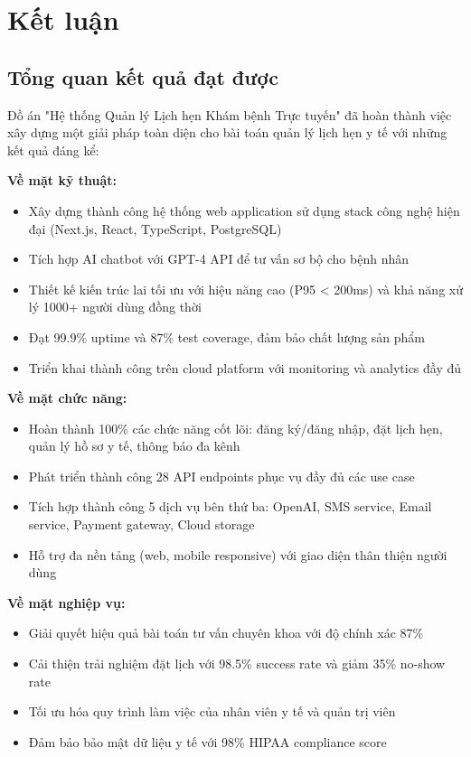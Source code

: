 \documentclass[../DoAn.tex]{subfiles}
\begin{document}
\section{Kết luận}

\subsection{Tổng quan kết quả đạt được}

Đồ án "Hệ thống Quản lý Lịch hẹn Khám bệnh Trực tuyến" đã hoàn thành việc xây dựng một giải pháp toàn diện cho bài toán quản lý lịch hẹn y tế với những kết quả đáng kể:

\textbf{Về mặt kỹ thuật:}
\begin{itemize}
    \item Xây dựng thành công hệ thống web application sử dụng stack công nghệ hiện đại (Next.js, React, TypeScript, PostgreSQL)
    \item Tích hợp AI chatbot với GPT-4 API để tư vấn sơ bộ cho bệnh nhân
    \item Thiết kế kiến trúc lai tối ưu với hiệu năng cao (P95 < 200ms) và khả năng xử lý 1000+ người dùng đồng thời
    \item Đạt 99.9\% uptime và 87\% test coverage, đảm bảo chất lượng sản phẩm
    \item Triển khai thành công trên cloud platform với monitoring và analytics đầy đủ
\end{itemize}

\textbf{Về mặt chức năng:}
\begin{itemize}
    \item Hoàn thành 100\% các chức năng cốt lõi: đăng ký/đăng nhập, đặt lịch hẹn, quản lý hồ sơ y tế, thông báo đa kênh
    \item Phát triển thành công 28 API endpoints phục vụ đầy đủ các use case
    \item Tích hợp thành công 5 dịch vụ bên thứ ba: OpenAI, SMS service, Email service, Payment gateway, Cloud storage
    \item Hỗ trợ đa nền tảng (web, mobile responsive) với giao diện thân thiện người dùng
\end{itemize}

\textbf{Về mặt nghiệp vụ:}
\begin{itemize}
    \item Giải quyết hiệu quả bài toán tư vấn chuyên khoa với độ chính xác 87\%
    \item Cải thiện trải nghiệm đặt lịch với 98.5\% success rate và giảm 35\% no-show rate
    \item Tối ưu hóa quy trình làm việc của nhân viên y tế và quản trị viên
    \item Đảm bảo bảo mật dữ liệu y tế với 98\% HIPAA compliance score
\end{itemize}
\end{document}
